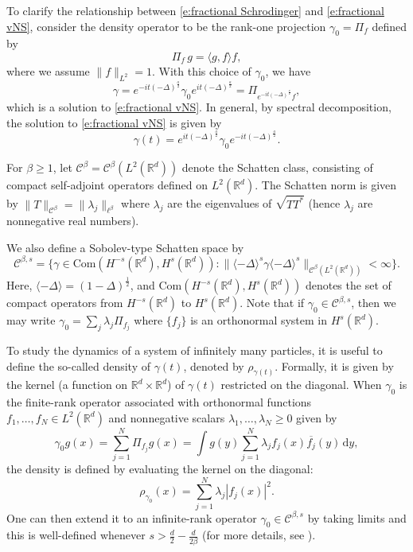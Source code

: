 \documentclass[a4paper]{amsart}
\numberwithin{figure}{section}
\numberwithin{equation}{section}%
\theoremstyle{plain}%
\theoremstyle{definition}
\theoremstyle{remark}%
\def\d{\mathrm{d}}
\newcommand{\R}{{\mathbb R}}
\def\C{\mathcal{C}}
\begin{document}
To clarify the relationship between \eqref{e:fractional Schrodinger} and \eqref{e:fractional vNS}, consider the density operator to be the rank-one projection $\gamma_0=\Pi_f$ defined by 
\[
\Pi_f\, g=\langle g,f \rangle f,
\]
where we assume $\|f\|_{L^2}=1$. With this choice of $\gamma_0$, we have 
\[
\gamma
=
e^{-it(-\Delta)^\frac a2} \gamma_0 e^{it(-\Delta)^\frac a2}
=
\Pi_{e^{-it(-\Delta)^{\frac a2}}\!f},
\]
which is a solution to \eqref{e:fractional vNS}.  In general, by spectral decomposition,
the solution to \eqref{e:fractional vNS} is given by
\[
\gamma(t)
=
e^{it(-\Delta)^\frac a2} \gamma_0 e^{-it(-\Delta)^\frac a2}. 
\]

For $\beta\ge1$, let $\mathcal C^\beta=\mathcal C^\beta(L^2(\R^{d}))$ denote the Schatten class, consisting of compact self-adjoint operators defined on $L^2(\R^{d})$. The Schatten norm is given by $\|T\|_{\mathcal C^\beta}= \|\lambda_j\|_{\ell^\beta}$ where $\lambda_j$ are the eigenvalues of $\sqrt{TT^*}$ (hence $\lambda_j$ are nonnegative real numbers).

We also define a Sobolev-type Schatten space by
\[
\mathcal C^{\beta,s} =\big\{ \gamma \in \text{Com}(H^{-s}(\R^d),H^s(\R^d)):
\big\|\langle -\Delta \rangle^{s}\gamma \langle -\Delta \rangle^{s}\big\|_{\mathcal C^\beta(L^2(\R^d))}<\infty\}.
\]
Here, $\langle-\Delta \rangle =(1-\Delta)^{\frac12}$, and $\text{Com}(H^{-s}(\R^d),H^s(\R^d))$ denotes the set of compact operators from $H^{-s}(\R^d)$ to $H^s(\R^d)$.
Note that if $\gamma_0 \in \mathcal C^{\beta,s}$, then we may write $\gamma_0 = \sum_j\lambda_j\Pi_{f_j}$ where $\{f_j\}$ is an orthonormal system in $H^s(\R^d)$.

To study the dynamics of a system of infinitely many particles, it is useful to define the so-called density of $\gamma(t)$, denoted by $\rho_{\gamma(t)}$. Formally, it is given by the kernel (a function on $\R^d\times\R^d$) of $\gamma(t)$ restricted on the diagonal. When $\gamma_0$ is the finite-rank operator associated with orthonormal functions $f_1,\dots,f_N\in L^2(\R^d)$ and nonnegative scalars $\lambda_1,\dots,\lambda_N\geq0$ given by 
\[
\gamma_{0}g(x)
=
\sum_{j=1}^N \Pi_{f_j} g(x)
=
\int g(y) \sum_{j=1}^N \lambda_j f_j(x) \overline{f_j}(y)\,\d y,
\]
the density is defined by evaluating the kernel on the diagonal:
\[
\rho_{\gamma_{0}}(x)=\sum_{j=1}^N \lambda_j |f_j(x)|^2.
\]
One can then extend it to an infinite-rank operator $\gamma_0\in\C^{\beta,s}$ by taking limits and this is well-defined whenever $s>\frac d2-\frac{d}{2\beta}$ (for more details, see \cite[Section 6]{BKS_TLMS}).
\end{document}
